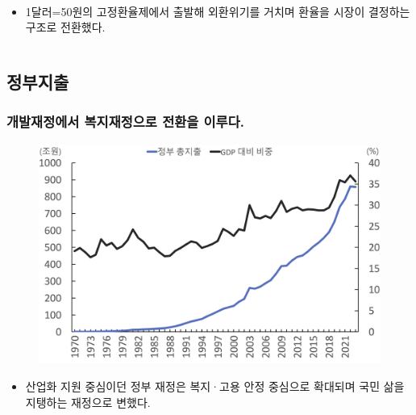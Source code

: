 \documentclass[aspectratio=169,xcolor=dvipsnames,handout]{beamer}
\begin{document}
\begin{frame}
\begin{columns}
\begin{column}{.5\textwidth}
\begin{figure}
            \\
        \end{figure}
        \begin{itemize}[<+->]
            \item 1달러=50원의 고정환율제에서 출발해 외환위기를 거치며 환율을 시장이 결정하는 구조로 전환했다.
        \end{itemize}
    \end{column}
\end{columns}
\end{frame}

\subsection{정부지출}
\begin{frame}[<+->]
\frametitle{개발재정에서 복지재정으로 전환을 이루다.}
    \begin{figure}
        \centering
        \includegraphics[width=.5\textwidth]{pic/fig_econ_10.png}
    \end{figure}
    \begin{itemize}
        \item 산업화 지원 중심이던 정부 재정은 복지·고용 안정 중심으로 확대되며 국민 삶을 지탱하는 재정으로 변했다.
    \end{itemize}
\end{frame}
\end{document}
